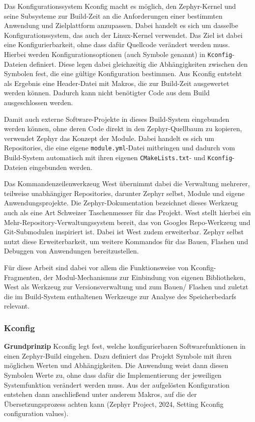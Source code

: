 Das Konfigurationssystem Kconfig macht es m{\"o}glich, den Zephyr-Kernel und seine Subsysteme zur Build-Zeit an die Anforderungen einer bestimmten Anwendung und Zielplattform anzupassen. Dabei handelt es sich um dasselbe Konfigurationssystem, das auch der Linux-Kernel verwendet. Das Ziel ist dabei eine Konfigurierbarkeit, ohne dass daf{\"u}r Quellcode ver{\"a}ndert werden muss. Hierbei werden Konfigurationsoptionen (auch \glqq{}Symbole\grqq{} genannt) in \lstinline[style=codeinline]|Kconfig|-Dateien definiert. Diese legen dabei gleichzeitig die Abh{\"a}ngigkeiten zwischen den Symbolen fest, die eine g{\"u}ltige Konfiguration bestimmen. Aus Kconfig entsteht als Ergebnis eine Header-Datei mit Makros, die zur Build-Zeit ausgewertet werden k{\"o}nnen. Dadurch kann nicht ben{\"o}tigter Code aus dem Build ausgeschlossen werden.

Damit auch externe Software-Projekte in dieses Build-System eingebunden werden k{\"o}nnen, ohne deren Code direkt in den Zephyr-Quellbaum zu kopieren, verwendet Zephyr das Konzept der Module. Dabei handelt es sich um Repositories, die eine eigene \lstinline[style=codeinline]|module.yml|-Datei mitbringen und dadurch vom Build-System automatisch mit ihren eigenen \lstinline[style=codeinline]|CMakeLists.txt|- und \lstinline[style=codeinline]|Kconfig|-Dateien eingebunden werden.

Das Kommandenzeilenwerkzeug West {\"u}bernimmt dabei die Verwaltung mehrerer, teilweise unabh{\"a}ngiger Repositories, darunter Zephyr selbst, Module und eigene Anwendungsprojekte. Die Zephyr-Dokumentation bezeichnet dieses Werkzeug auch als eine Art \glqq{}Schweizer Taschenmesser\grqq{} f{\"u}r das Projekt. West stellt hierbei ein Mehr-Repository-Verwaltungssystem bereit, das von Googles Repo-Werkzeug und Git-Submodulen inspiriert ist. Dabei ist West zudem erweiterbar. Zephyr selbst nutzt diese Erweiterbarkeit, um weitere Kommandos f{\"u}r das Bauen, Flashen und Debuggen von Anwendungen bereitzustellen.

F{\"u}r diese Arbeit sind dabei vor allem die Funktionsweise von Kconfig-Fragmenten, der Modul-Mechanismus zur Einbindung von eigenen Bibliotheken, West als Werkzeug zur Versionsverwaltung und zum Bauen/ Flashen und zuletzt die im Build-System enthaltenen Werkzeuge zur Analyse des Speicherbedarfs relevant.

\subsubsection{Kconfig}
\textbf{Grundprinzip} Kconfig legt fest, welche konfigurierbaren Softwarefunktionen in einen Zephyr-Build eingehen. Dazu definiert das Projekt Symbole mit ihren m{\"o}glichen Werten und Abh{\"a}ngigkeiten. Die Anwendung weist dann diesen Symbolen Werte zu, ohne dass daf{\"u}r die Implementierung der jeweiligen Systemfunktion ver{\"a}ndert werden muss. Aus der aufgel{\"o}sten Konfiguration entstehen dann anschlie{\ss}end unter anderem Makros, auf die der {\"U}bersetzungsprozess achten kann (Zephyr Project, 2024, \glqq{}Setting Kconfig configuration values\grqq{}).


